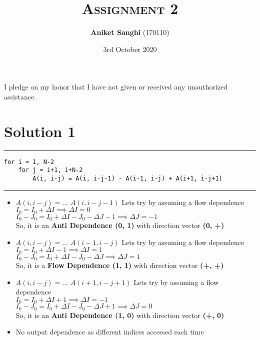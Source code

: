 \documentclass[a4paper]{article}
\title{\textsc{Assignment 2}}
\author{\textbf{Aniket Sanghi} (170110)}
\date{3rd October 2020}
\begin{document}
\maketitle
\thispagestyle{fancy}
\fancyhead{}
\cfoot{\thepage}
\begin{center}
I pledge on my honor that I have not given or received any unauthorized assistance.\\
\end{center}

\vspace{3cm}
\section{Solution 1}

\hrule
\begin{lstlisting}
for i = 1, N-2
    for j = i+1, i+N-2
        A(i, i-j) = A(i, i-j-1) - A(i-1, i-j) + A(i+1, i-j+1)
\end{lstlisting}
\hrule 
\vspace{0.5cm}
\begin{itemize}
\item $A(i, i-j) = ... \,\, A(i, i-j-1)$ Lets try by assuming a flow dependence\\
	$I_0 = I_0 + \Delta I \implies \Delta I = 0$ \\
	$I_0 - J_0 = I_0 + \Delta I - J_0 - \Delta J - 1 \implies \Delta J = -1$ \\
	So, it is an {\bf Anti Dependence (0, 1)} with direction vector {\bf (0, +)}
\item $A(i, i-j) = ... \,\, A(i-1, i-j)$ Lets try by assuming a flow dependence\\
	$I_0 = I_0 + \Delta I - 1 \implies \Delta I = 1$ \\
	$I_0 - J_0 = I_0 + \Delta I - J_0 - \Delta J \implies \Delta J = 1$ \\
	So, it is a {\bf Flow Dependence (1, 1)} with direction vector {\bf (+, +)}
\item $A(i, i-j) = ... \,\, A(i+1, i-j+1)$ Lets try by assuming a flow dependence\\
	$I_0 = I_0 + \Delta I + 1 \implies \Delta I = -1$ \\
	$I_0 - J_0 = I_0 + \Delta I - J_0 - \Delta J + 1\implies \Delta J = 0$ \\
	So, it is an {\bf Anti Dependence (1, 0)} with direction vector {\bf (+, 0)}
\item No output dependence as different indices accessed each time
\end{itemize}
\end{document}
